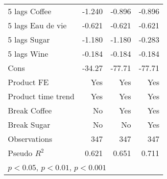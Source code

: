 \begin{table}[htbp]
\begin{tabular}{l*{3}{D{.}{.}{-1}}}
5 lags Coffee       &      -1.240\sym{*}  &      -0.896\sym{*}  &      -0.896\sym{*}  \\
5 lags Eau de vie   &      -0.621         &      -0.621         &      -0.621         \\
5 lags Sugar        &      -1.180         &      -1.180         &      -0.283         \\
5 lags Wine         &      -0.184         &      -0.184         &      -0.184         \\
Cons                &      -34.27\sym{**} &      -77.71\sym{***}&      -77.71\sym{***}\\
Product FE          &         Yes         &         Yes         &         Yes         \\
Product time trend  &         Yes         &         Yes         &         Yes         \\
Break Coffee        &          No         &         Yes         &         Yes         \\
Break Sugar         &          No         &          No         &         Yes         \\
\hline
Observations        &         347         &         347         &         347         \\
Pseudo \(R^{2}\)    &       0.621         &       0.651         &       0.711         \\
\hline\hline
{}\\
\end{tabular}
\end{table}
